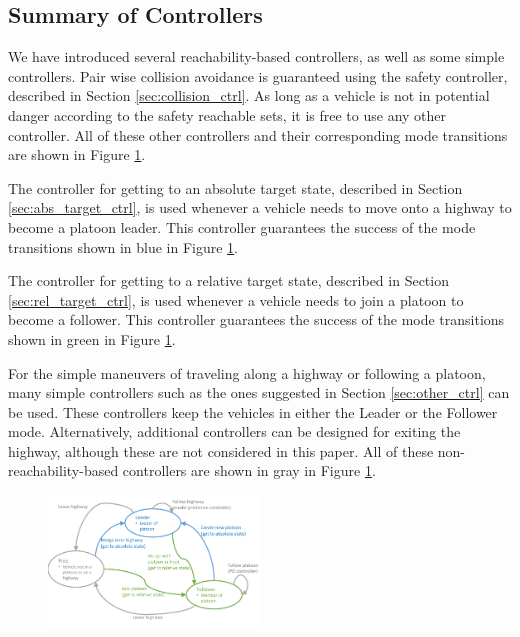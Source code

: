 \subsection{Summary of Controllers}
We have introduced several reachability-based controllers, as well as some simple controllers. Pair wise collision avoidance is guaranteed using the safety controller, described in Section \ref{sec:collision_ctrl}. As long as a vehicle is not in potential danger according to the safety reachable sets, it is free to use any other controller. All of these other controllers and their corresponding mode transitions are shown in Figure \ref{fig:modeControllers}.

The controller for getting to an absolute target state, described in Section \ref{sec:abs_target_ctrl}, is used whenever a vehicle needs to move onto a highway to become a platoon leader. This controller guarantees the success of the mode transitions shown in blue in Figure \ref{fig:modeControllers}.

The controller for getting to a relative target state, described in Section \ref{sec:rel_target_ctrl}, is used whenever a vehicle needs to join a platoon to become a follower. This controller guarantees the success of the mode transitions shown in green in Figure \ref{fig:modeControllers}.

For the simple maneuvers of traveling along a highway or following a platoon, many simple controllers such as the ones suggested in Section \ref{sec:other_ctrl} can be used. These controllers keep the vehicles in either the Leader or the Follower mode. Alternatively, additional controllers can be designed for exiting the highway, although these are not considered in this paper. All of these non-reachability-based controllers are shown in gray in Figure \ref{fig:modeControllers}.

\begin{figure}
	\centering
	\includegraphics[width=0.5\textwidth]{"fig/modeControllers"}
	\caption{}
	\label{fig:modeControllers}
\end{figure}